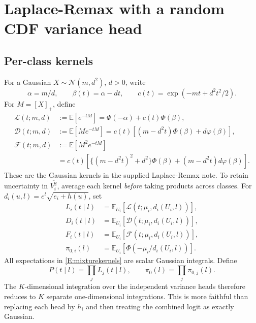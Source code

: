 \documentclass[letterpaper]{article}
\newcommand{\E}{\mathbb E}
\newcommand{\Normal}{\mathcal N}
\newcommand{\vbari}{\overline{V_i^2}}
\newcommand{\given}{\mid}
\begin{document}
\section{Laplace-Remax with a random CDF variance head}\label{S:laplace}
\subsection{Per-class kernels}
For a Gaussian $X\sim\Normal(m,d^2)$, $d>0$, write
\begin{equation}
\alpha=m/d,\qquad \beta(t)=\alpha-dt,\qquad c(t)=\exp(-mt+d^2t^2/2).
\end{equation}
For $M=[X]_+$, define
\begin{align}
\mathcal L(t;m,d)&:=\E[e^{-tM}]=\Phi(-\alpha)+c(t)\Phi(\beta),\\
\mathcal D(t;m,d)&:=\E[Me^{-tM}]=c(t)[(m-d^2t)\Phi(\beta)+d\varphi(\beta)],\\
\mathcal F(t;m,d)&:=\E[M^2e^{-tM}]\nonumber\\
&=c(t)\left[\{(m-d^2t)^2+d^2\}\Phi(\beta)+(m-d^2t)d\varphi(\beta)\right].
\label{E:kernels}
\end{align}
These are the Gaussian kernels in the supplied Laplace-Remax note. To retain uncertainty in $\vbari$, average each kernel \emph{before} taking products across classes. For $d_i(u,l)=e^l\sqrt{e_i+h(u)}$, set
\begin{align}
L_i(t\given l)&=\E_{U_i}[\mathcal L(t;\mu_i,d_i(U_i,l))],\\
D_i(t\given l)&=\E_{U_i}[\mathcal D(t;\mu_i,d_i(U_i,l))],\\
F_i(t\given l)&=\E_{U_i}[\mathcal F(t;\mu_i,d_i(U_i,l))],\\
\pi_{0,i}(l)&=\E_{U_i}\left[\Phi\!\left(-\mu_i/d_i(U_i,l)\right)\right].
\label{E:mixturekernels}
\end{align}
All expectations in \eqref{E:mixturekernels} are scalar Gaussian integrals. Define
\begin{equation}
P(t\given l)=\prod_jL_j(t\given l),\qquad \pi_0(l)=\prod_j\pi_{0,j}(l).
\end{equation}
The $K$-dimensional integration over the independent variance heads therefore reduces to $K$ separate one-dimensional integrations. This is more faithful than replacing each head by $h_i$ and then treating the combined logit as exactly Gaussian.
\end{document}
